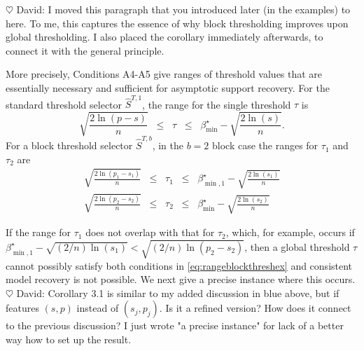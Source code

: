 \documentclass[aos]{imsart}
\theoremstyle{plain}
\newcommand{\david}[1]{{\small{\color{blue} \sf $\heartsuit$ David: #1}}}
\newcommand{\piotr}[1]{{\small{\color{red} \sf $\clubsuit$ Piotr: #1}}}
\begin{document}
\david{I moved this paragraph that you introduced later (in the examples) to here. To me, this captures the essence of why block thresholding improves upon global thresholding. I also placed the corollary immediately afterwards, to connect it with the general principle.}

More precisely, Conditions A4-A5 give ranges of threshold values that are essentially necessary and sufficient for asymptotic support recovery. For the standard threshold selector $\hat{S}^{T,1}$, the range for the single threshold $\tau$ is
\begin{equation}\label{eq:rangethreshex}
  \sqrt{\frac{2\ln(p-s)}{n}}\;\;\leq\;\;\tau\;\;\leq\;\;\beta^{\star}_{\min}-\sqrt{\frac{2\ln(s)}{n}}.	
\end{equation}
For a block threshold selector $\hat{S}^{T,b}$, in the $b=2$ block case the ranges for $\tau_1$ and $\tau_2$ are
\begin{equation}
    \begin{aligned}\label{eq:rangeblockthreshex}
  \sqrt{\frac{2\ln(p_1-s_1)}{n}}\;\;\leq\;\;\tau_1\;\;\leq\;\;\beta^{\star}_{\min,1}-\sqrt{\frac{2\ln(s_1)}{n}}\\
  \sqrt{\frac{2\ln(p_2-s_2)}{n}}\;\;\leq\;\;\tau_2\;\;\leq\;\;\beta^{\star}_{\min}-\sqrt{\frac{2\ln(s_2)}{n}}        
    \end{aligned}
\end{equation}

\color{blue}
If the range for $\tau_1$ does not overlap with that for $\tau_2$, 
which, for example, occurs if $\beta_{\min,1}^{\star} - \sqrt{(2/n) \ln(s_1)} < \sqrt{(2/n) \ln(p_2-s_2)}$,
then a global threshold $\tau$ cannot possibly satisfy both conditions in 
\eqref{eq:rangeblockthreshex} and consistent model recovery is not possible.
We next give a precise instance where this occurs.
\color{black}\piotr{nice!}
\david{Corollary 3.1 is similar to my added discussion in blue above, but if features $(s,p)$ instead of $(s_j,p_j)$. Is it a refined version? How does it connect to the previous discussion? I just wrote "a precise instance" for lack of a better way how to set up the result.}
\end{document}
